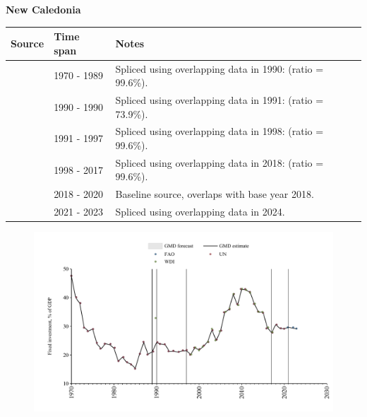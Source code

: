 \documentclass[12pt,a4paper,landscape]{article}
\begin{document}
\begin{adjustbox}{max totalsize={\paperwidth}{\paperheight},center}
\begin{minipage}[t][\textheight][t]{\textwidth}
\vspace*{0.5cm}
{}
\begin{center}
{\Large\bfseries New Caledonia}
\end{center}
\vspace{0.5cm}
\begin{table}[H]
\centering
\small
\begin{tabular}{|l|l|l|}
\hline
\textbf{Source} & \textbf{Time span} & \textbf{Notes} \\
\hline
\rowcolor{white}\cite{UN}& 1970 - 1989 &Spliced using overlapping data in 1990: (ratio = 99.6\%).\\
\rowcolor{lightgray}\cite{WDI}& 1990 - 1990 &Spliced using overlapping data in 1991: (ratio = 73.9\%).\\
\rowcolor{white}\cite{UN}& 1991 - 1997 &Spliced using overlapping data in 1998: (ratio = 99.6\%).\\
\rowcolor{lightgray}\cite{WDI}& 1998 - 2017 &Spliced using overlapping data in 2018: (ratio = 99.6\%).\\
\rowcolor{white}\cite{UN}& 2018 - 2020 &Baseline source, overlaps with base year 2018.\\
\rowcolor{lightgray}\cite{FAO}& 2021 - 2023 &Spliced using overlapping data in 2024.\\
\hline
\end{tabular}
\end{table}
\begin{figure}[H]
\centering
\includegraphics[width=\textwidth,height=0.6\textheight,keepaspectratio]{graphs/NCL_finv_GDP.pdf}
\end{figure}
\end{minipage}
\end{adjustbox}
\end{document}
